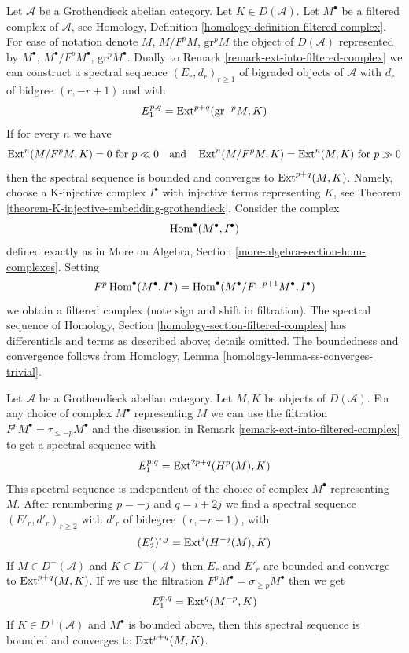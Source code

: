 \begin{remark}
\label{remark-ext-from-filtered-complex}
Let $\mathcal{A}$ be a Grothendieck abelian category. Let
$K \in D(\mathcal{A})$. Let $M^\bullet$ be a filtered complex of
$\mathcal{A}$, see Homology, Definition
\ref{homology-definition-filtered-complex}.
For ease of notation denote $M$, $M/F^pM$, $\text{gr}^pM$ the
object of $D(\mathcal{A})$ represented by $M^\bullet$,
$M^\bullet/F^pM^\bullet$, $\text{gr}^pM^\bullet$.
Dually to Remark \ref{remark-ext-into-filtered-complex}
we can construct a spectral sequence $(E_r, d_r)_{r \geq 1}$
of bigraded objects of $\mathcal{A}$ with $d_r$ of bidgree
$(r, -r + 1)$ and
with
$$
E_1^{p, q} = \mathop{\mathrm{Ext}}\nolimits^{p + q}(\text{gr}^{-p}M, K)
$$
If for every $n$ we have
$$
\mathop{\mathrm{Ext}}\nolimits^n(M/F^pM, K) = 0 \text{ for } p \ll 0
\quad\text{and}\quad
\mathop{\mathrm{Ext}}\nolimits^n(M/F^pM, K) = \mathop{\mathrm{Ext}}\nolimits^n(M, K) \text{ for } p \gg 0
$$
then the spectral sequence is bounded and converges to $\mathop{\mathrm{Ext}}\nolimits^{p + q}(M, K)$.
Namely, choose a K-injective complex $I^\bullet$ with injective terms
representing $K$, see Theorem \ref{theorem-K-injective-embedding-grothendieck}.
Consider the complex
$$
\mathop{\mathrm{Hom}}\nolimits^\bullet(M^\bullet, I^\bullet)
$$
defined exactly as in
More on Algebra, Section \ref{more-algebra-section-hom-complexes}.
Setting
$$
F^p\mathop{\mathrm{Hom}}\nolimits^\bullet(M^\bullet, I^\bullet) =
\mathop{\mathrm{Hom}}\nolimits^\bullet(M^\bullet/F^{-p + 1}M^\bullet, I^\bullet)
$$
we obtain a filtered complex (note sign and shift in filtration).
The spectral sequence of
Homology, Section \ref{homology-section-filtered-complex}
has differentials and terms as described above; details omitted.
The boundedness and convergence follows from
Homology, Lemma \ref{homology-lemma-ss-converges-trivial}.
\end{remark}

\begin{remark}
\label{remark-spectral-sequences-ext-variant}
Let $\mathcal{A}$ be a Grothendieck abelian category.
Let $M, K$ be objects of $D(\mathcal{A})$.
For any choice of complex $M^\bullet$ representing $M$ we
can use the filtration $F^pM^\bullet = \tau_{\leq -p}M^\bullet$
and the discussion in Remark \ref{remark-ext-into-filtered-complex}
to get a spectral sequence with
$$
E_1^{p, q} = \mathop{\mathrm{Ext}}\nolimits^{2p + q}(H^p(M), K)
$$
This spectral sequence is independent of the choice of complex $M^\bullet$
representing $M$. After renumbering $p = -j$ and $q = i + 2j$ we find a
spectral sequence $(E'_r, d'_r)_{r \geq 2}$ with $d'_r$ of bidegree
$(r, -r + 1)$, with
$$
(E'_2)^{i, j} = \mathop{\mathrm{Ext}}\nolimits^i(H^{-j}(M), K)
$$
If $M \in D^-(\mathcal{A})$ and $K \in D^+(\mathcal{A})$
then $E_r$ and $E'_r$ are bounded and converge to $\mathop{\mathrm{Ext}}\nolimits^{p + q}(M, K)$.
If we use the filtration $F^pM^\bullet = \sigma_{\geq p}M^\bullet$
then we get
$$
E_1^{p, q} = \mathop{\mathrm{Ext}}\nolimits^q(M^{-p}, K)
$$
If $K \in D^+(\mathcal{A})$ and $M^\bullet$ is bounded above, then
this spectral sequence is bounded and converges to $\mathop{\mathrm{Ext}}\nolimits^{p + q}(M, K)$.
\end{remark}


